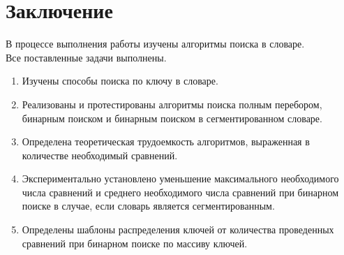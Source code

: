 \documentclass[a4paper,oneside,14pt]{extreport}
\begin{document}
\chapter*{Заключение}
В процессе выполнения работы изучены алгоритмы поиска в словаре.\\

Все поставленные задачи выполнены.
\begin{enumerate}
	\item Изучены способы поиска по ключу в словаре.
	\item Реализованы и протестированы алгоритмы поиска полным перебором, бинарным поиском и бинарным поиском в сегментированном словаре.
	\item Определена теоретическая трудоемкость алгоритмов, выраженная в количестве необходимый сравнений.
	\item Экспериментально установлено уменьшение максимального необходимого числа сравнений и среднего необходимого числа сравнений при бинарном поиске в случае, если словарь является сегментированным.
	\item Определены шаблоны распределения ключей от количества проведенных сравнений при бинарном поиске по массиву ключей.
\end{enumerate}
\newpage
{}



\nocite{*}
\end{document}
